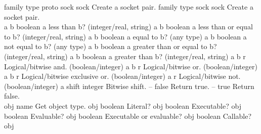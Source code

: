 \begin{longtable}{}
\optableent
	{family type proto}
	{{\bf {}}}
	{sock sock}
	{Create a socket pair.}
\optableent
	{family type}
	{{\bf {}}}
	{sock sock}
	{Create a socket pair.}
\hline \hline
{} \\
\hline \hline
\optableent
	{a b}
	{{\bf {}}}
	{boolean}
	{a less than b? (integer/real, string)}
\hline
\optableent
	{a b}
	{{\bf {}}}
	{boolean}
	{a less than or equal to b? (integer/real, string)}
\hline
\optableent
	{a b}
	{{\bf {}}}
	{boolean}
	{a equal to b? (any type)}
\hline
\optableent
	{a b}
	{{\bf {}}}
	{boolean}
	{a not equal to b? (any type)}
\hline
\optableent
	{a b}
	{{\bf {}}}
	{boolean}
	{a greater than or equal to b? (integer/real, string)}
\hline
\optableent
	{a b}
	{{\bf {}}}
	{boolean}
	{a greater than b? (integer/real, string)}
\hline
\optableent
	{a b}
	{{\bf {}}}
	{r}
	{Logical/bitwise and. (boolean/integer) }
\hline
\optableent
	{a b}
	{{\bf {}}}
	{r}
	{Logical/bitwise or. (boolean/integer)}
\hline
\optableent
	{a b}
	{{\bf {}}}
	{r}
	{Logical/bitwise exclusive or. (boolean/integer)}
\hline
\optableent
	{a}
	{{\bf {}}}
	{r}
	{Logical/bitwise not. (boolean/integer)}
\hline
\optableent
	{a shift}
	{{\bf {}}}
	{integer}
	{Bitwise shift.}
\hline
\optableent
	{--}
	{{\bf {}}}
	{false}
	{Return true.}
\hline
\optableent
	{--}
	{{\bf {}}}
	{true}
	{Return false.}
\hline \hline
{} \\
\hline \hline
\optableent
	{obj}
	{{\bf {}}}
	{name}
	{Get object type.}
\hline
\optableent
	{obj}
	{{\bf {}}}
	{boolean}
	{Literal?}
\hline
\optableent
	{obj}
	{{\bf {}}}
	{boolean}
	{Executable?}
\hline
\optableent
	{obj}
	{{\bf {}}}
	{boolean}
	{Evaluable?}
\hline
\optableent
	{obj}
	{{\bf {}}}
	{boolean}
	{Executable or evaluable?}
\hline
\optableent
	{obj}
	{{\bf {}}}
	{boolean}
	{Callable?}
\hline
\optableent
	{obj}

\end{longtable}
